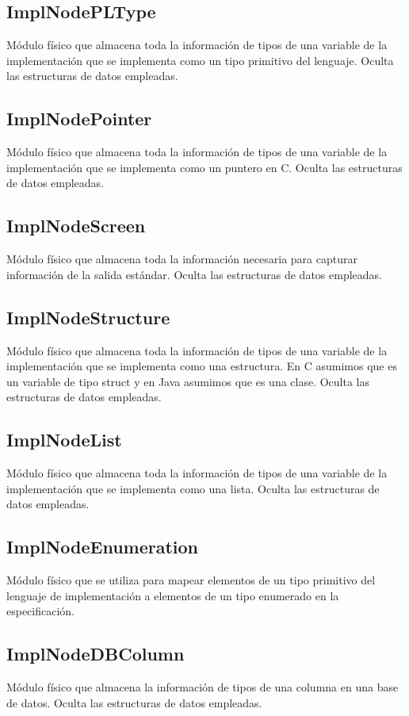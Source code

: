 \documentclass[a4paper,10pt]{report}
\begin{document}
				\subsection{ImplNodePLType}
				Módulo físico que almacena toda la información de tipos de una variable de la implementación que se implementa como un tipo primitivo del lenguaje. Oculta las estructuras de datos empleadas.
				\subsection{ImplNodePointer}
				Módulo físico que almacena toda la información de tipos de una variable de la implementación que se implementa como un puntero en C. Oculta las estructuras de datos empleadas.
				\subsection{ImplNodeScreen}
				Módulo físico que almacena toda la información necesaria para capturar información de la salida estándar. Oculta las estructuras de datos empleadas.
				\subsection{ImplNodeStructure}
				Módulo físico que almacena toda la información de tipos de una variable de la implementación que se implementa como una estructura. En C asumimos que es un variable de tipo struct y en Java asumimos que es una clase. Oculta las estructuras de datos empleadas.
				\subsection{ImplNodeList}
				Módulo físico que almacena toda la información de tipos de una variable de la implementación que se implementa como una lista. Oculta las estructuras de datos empleadas.
				\subsection{ImplNodeEnumeration}
				Módulo físico que se utiliza para mapear elementos de un tipo primitivo del lenguaje de implementación a elementos de un tipo enumerado en la especificación.
				\subsection{ImplNodeDBColumn}
				Módulo físico que almacena la información de tipos de una columna en una base de datos. Oculta las estructuras de datos empleadas.
\end{document}
